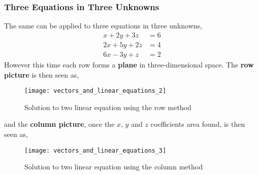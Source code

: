         \subsubsection{Three Equations in Three Unknowns}
            The same can be applied to three equations in three unknowns,
            \begin{equation}
                \begin{split}
                    x + 2y +3z &= 6 \\
                    2x + 5y + 2z &= 4 \\
                    6x - 3y + z &= 2
                \end{split}
            \end{equation}
            However this time each row forms a \textbf{plane} in three-dimensional space. The \textbf{row picture} is then seen as,
            \begin{figure}[h]
                \texttt{[image: vectors\_and\_linear\_equations\_2]}
                \centering
                \caption{Solution to two linear equation using the row method}
            \end{figure}
            \par \hfill \break
            and the \textbf{column picture}, once the \(x\), \(y\) and \(z\) coefficients area found, is then seen as,
            \begin{figure}[h]
                \texttt{[image: vectors\_and\_linear\_equations\_3]}
                \centering
                \caption{Solution to two linear equation using the column method}
            \end{figure}

